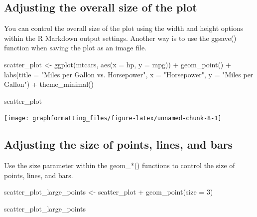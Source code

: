 \documentclass[
]{book}
\newenvironment{Shaded}{\begin{snugshade}}{\end{snugshade}}
\newcommand{\AttributeTok}[1]{\textcolor[rgb]{0.77,0.63,0.00}{#1}}
\newcommand{\DecValTok}[1]{\textcolor[rgb]{0.00,0.00,0.81}{#1}}
\newcommand{\FunctionTok}[1]{\textcolor[rgb]{0.00,0.00,0.00}{#1}}
\newcommand{\NormalTok}[1]{#1}
\newcommand{\OtherTok}[1]{\textcolor[rgb]{0.56,0.35,0.01}{#1}}
\newcommand{\SpecialCharTok}[1]{\textcolor[rgb]{0.00,0.00,0.00}{#1}}
\newcommand{\StringTok}[1]{\textcolor[rgb]{0.31,0.60,0.02}{#1}}
\begin{document}
\hypertarget{adjusting-the-overall-size-of-the-plot}{%
\subsection{Adjusting the overall size of the plot}\label{adjusting-the-overall-size-of-the-plot}}

You can control the overall size of the plot using the width and height options within the R Markdown output settings. Another way is to use the ggsave() function when saving the plot as an image file.

\begin{Shaded}
\begin{Highlighting}[]
\NormalTok{scatter\_plot }\OtherTok{\textless{}{-}} \FunctionTok{ggplot}\NormalTok{(mtcars, }\FunctionTok{aes}\NormalTok{(}\AttributeTok{x =}\NormalTok{ hp, }\AttributeTok{y =}\NormalTok{ mpg)) }\SpecialCharTok{+}
  \FunctionTok{geom\_point}\NormalTok{() }\SpecialCharTok{+}
  \FunctionTok{labs}\NormalTok{(}\AttributeTok{title =} \StringTok{"Miles per Gallon vs. Horsepower"}\NormalTok{,}
       \AttributeTok{x =} \StringTok{"Horsepower"}\NormalTok{,}
       \AttributeTok{y =} \StringTok{"Miles per Gallon"}\NormalTok{) }\SpecialCharTok{+}
  \FunctionTok{theme\_minimal}\NormalTok{()}

\NormalTok{scatter\_plot}
\end{Highlighting}
\end{Shaded}

\texttt{[image: graphformatting\_files/figure-latex/unnamed-chunk-8-1]}

\hypertarget{adjusting-the-size-of-points-lines-and-bars}{%
\subsection{Adjusting the size of points, lines, and bars}\label{adjusting-the-size-of-points-lines-and-bars}}

Use the size parameter within the geom\_*() functions to control the size of points, lines, and bars.

\begin{Shaded}
\begin{Highlighting}[]
\NormalTok{scatter\_plot\_large\_points }\OtherTok{\textless{}{-}}\NormalTok{ scatter\_plot }\SpecialCharTok{+}
  \FunctionTok{geom\_point}\NormalTok{(}\AttributeTok{size =} \DecValTok{3}\NormalTok{)}

\NormalTok{scatter\_plot\_large\_points}
\end{Highlighting}
\end{Shaded}
\end{document}

